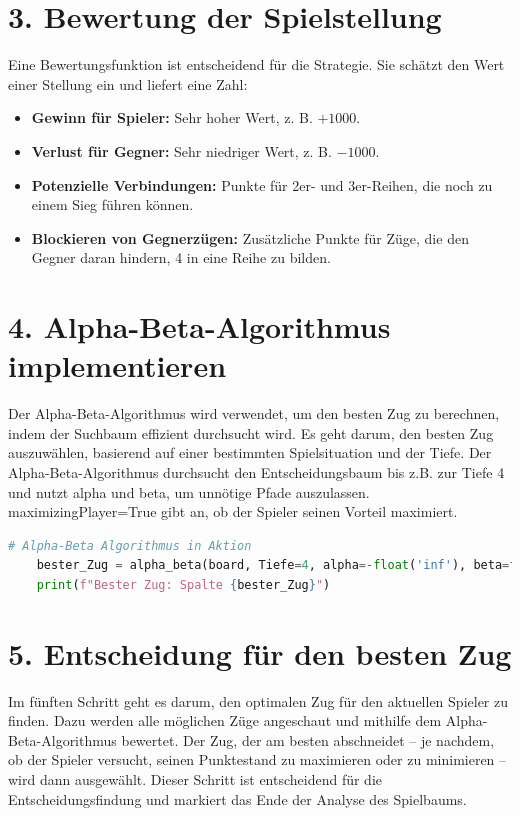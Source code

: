 \section*{3. Bewertung der Spielstellung}

Eine Bewertungsfunktion ist entscheidend für die Strategie. Sie schätzt den Wert einer Stellung ein und liefert eine Zahl:

\begin{itemize}
	\item \textbf{Gewinn für Spieler:} Sehr hoher Wert, z. B. \( +1000 \).
	\item \textbf{Verlust für Gegner:} Sehr niedriger Wert, z. B. \( -1000 \).
	\item \textbf{Potenzielle Verbindungen:} Punkte für 2er- und 3er-Reihen, die noch zu einem Sieg führen können.
	\item \textbf{Blockieren von Gegnerzügen:} Zusätzliche Punkte für Züge, die den Gegner daran hindern, 4 in eine Reihe zu bilden.
\end{itemize}

\section*{4. Alpha-Beta-Algorithmus implementieren}
	Der Alpha-Beta-Algorithmus wird verwendet, um den besten Zug zu berechnen, indem der Suchbaum effizient durchsucht wird. 
    Es geht darum, den besten Zug auszuwählen, basierend auf einer bestimmten Spielsituation und der Tiefe. Der Alpha-Beta-Algorithmus durchsucht den Entscheidungsbaum bis z.B. zur Tiefe 4 und nutzt alpha und beta, um unnötige Pfade auszulassen. maximizingPlayer=True gibt an, ob der Spieler seinen Vorteil maximiert.
\begin{lstlisting}[language=Python, caption=Alpha-Beta Algorithmus - Kurzer Überblick]
	# Alpha-Beta Algorithmus in Aktion
	bester_Zug = alpha_beta(board, Tiefe=4, alpha=-float('inf'), beta=float('inf'), maximizingPlayer=True)
	print(f"Bester Zug: Spalte {bester_Zug}")
\end{lstlisting}

\section*{5. Entscheidung für den besten Zug}

Im fünften Schritt geht es darum, den optimalen Zug für den aktuellen Spieler zu finden. Dazu werden alle möglichen Züge angeschaut und mithilfe dem Alpha-Beta-Algorithmus bewertet. Der Zug, der am besten abschneidet – je nachdem, ob der Spieler versucht, seinen Punktestand zu maximieren oder zu minimieren – wird dann ausgewählt. Dieser Schritt ist entscheidend für die Entscheidungsfindung und markiert das Ende der Analyse des Spielbaums.

